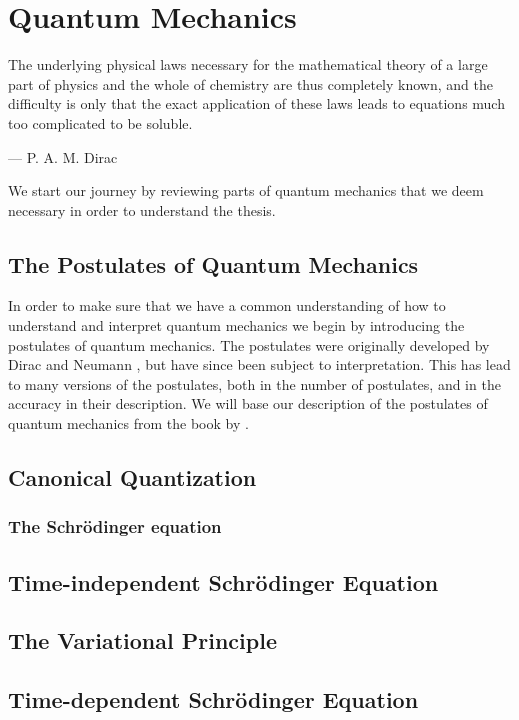 \chapter{Quantum Mechanics}
    \epigraph{The underlying physical laws necessary for the mathematical
    theory of a large part of physics and the whole of chemistry are thus
    completely known, and the difficulty is only that the exact application of
    these laws leads to equations much too complicated to be soluble.}
    {--- P. A. M. Dirac}

    We start our journey by reviewing parts of quantum mechanics that we deem
    necessary in order to understand the thesis.

    \section{The Postulates of Quantum Mechanics}
        In order to make sure that we have a common understanding of how to
        understand and interpret quantum mechanics we begin by introducing the
        postulates of quantum mechanics.
        The postulates were originally developed by Dirac
        \cite{dirac1981principles} and Neumann \cite{von2018mathematical},
        but have since been subject to interpretation.
        This has lead to many versions of the postulates, both in the number of
        postulates, and in the accuracy in their description.
        We will base our description of the postulates of quantum mechanics from
        the book  by
        \citeauthor{salasnich2017quantum} \cite{salasnich2017quantum}.

    \section{Canonical Quantization}
        \subsection{The Schrödinger equation}

    \section{Time-independent Schrödinger Equation}
    \section{The Variational Principle}
    \section{Time-dependent Schrödinger Equation}
